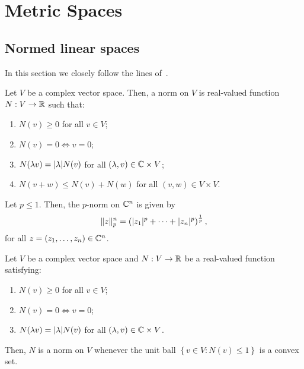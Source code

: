 \chapter{Metric Spaces}\label{chp:metric-spaces}

\section{Normed linear spaces}

In this section we closely follow the lines
of~\cite{yet_another_proof_of_minkowskis_inequality}.

\begin{definition}\label{def:normed-linear-spaces}
  Let \(V\) be a complex vector space. Then, a norm on \(V\) is real-valued
  function \(N:V\to\mathbb{R}\) such that:
  \begin{enumerate}
    \item
      \(N(v)\geqslant{0}\) for all \(v\in{V}\);
    \item
      \(N(v)=0\iff{v=0}\);
    \item
      \(N(\lambda{v})=\lvert\lambda\rvert N(v)\) for all
      \((\lambda,v)\in\mathbb{C}\times{V}\);
    \item
      \(N(v+w)\leqslant{N(v)+N(w)}\) for all \((v,w)\in{V\times{V}}\).
  \end{enumerate}
\end{definition}

\begin{definition}[\(p\)-norm]
  Let \(p\leqslant{1}\). Then, the \(p\)-norm on \(\mathbb{C}^{n}\) is given by
  \[
    \norm<n>(p)[z]
    =
    \left(\abs{z_{1}}^{p}+\cdots+\abs{z_{n}}^{p}\right)^{\frac{1}{p}},
  \]
  for all \(z=(z_{1},\ldots,z_{n})\in\mathbb{C}^{n}\).
\end{definition}

\begin{lemma}
  Let \(V\) be a complex vector space and \(N:V\to\mathbb{R}\) be a real-valued
  function satisfying:
  \begin{enumerate}
    \item
      \(N(v)\geqslant{0}\) for all \(v\in{V}\);
    \item
      \(N(v)=0\iff{v=0}\);
    \item
      \(N(\lambda{v})=\lvert\lambda\rvert N(v)\) for all
      \((\lambda,v)\in\mathbb{C}\times{V}\).
  \end{enumerate}
  Then, \(N\) is a norm on \(V\) whenever the unit ball
  \(\left\{v\in{V}:N(v)\leqslant{1}\right\}\) is a convex set.
\end{lemma}


